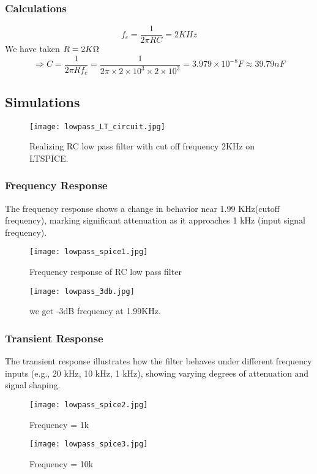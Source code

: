 \documentclass[conference]{IEEEtran}
\begin{document}
\subsubsection{Calculations}
$$f_c = \frac{1}{2\pi RC}= 2KHz$$
We have taken $R = 2K\ohm$
$$\Rightarrow C = \frac{1}{2\pi Rf_c} = \frac{1}{2\pi \times2\times10^3\times2\times10^3} = 3.979\times10^{-8}F\approx39.79nF$$

\subsection{Simulations}

\begin{figure}[H]
\centering
\texttt{[image: lowpass\_LT\_circuit.jpg]}
\caption{ Realizing RC low pass filter with cut off frequency 2KHz on
LTSPICE.}
\end{figure}
\subsubsection{Frequency Response}

The frequency response shows a change in behavior near 1.99 KHz(cutoff frequency), marking significant attenuation as it approaches 1 kHz (input signal frequency).

\begin{figure}[H]
\centering
\texttt{[image: lowpass\_spice1.jpg]}
\caption{Frequency response of RC low pass filter}
\end{figure}

\begin{figure}[H]
\centering
\texttt{[image: lowpass\_3db.jpg]}
\caption{we get -3dB frequency at 1.99KHz.}
\end{figure}

\subsubsection{Transient Response}
The transient response illustrates how the filter behaves under different frequency inputs (e.g., 20 kHz, 10 kHz, 1 kHz), showing varying degrees of attenuation and signal shaping.

\begin{figure}[H]
\centering
\texttt{[image: lowpass\_spice2.jpg]}
\caption{Frequency = 1k}
\end{figure}

\begin{figure}[H]
\centering
\texttt{[image: lowpass\_spice3.jpg]}
\caption{Frequency = 10k}
\end{figure}
\end{document}
